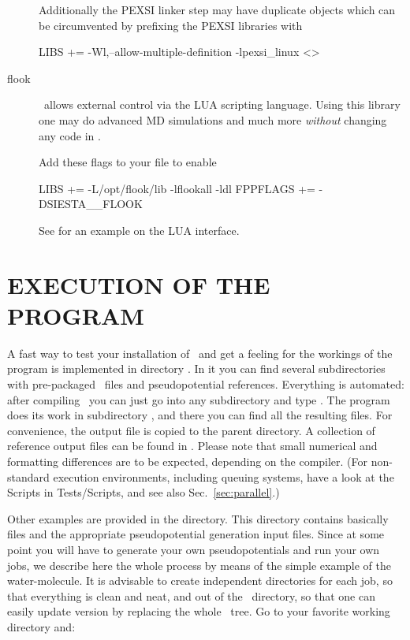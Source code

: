 \begin{description}
  Additionally the PEXSI linker step may have duplicate objects which
  can be circumvented by prefixing the PEXSI libraries with
\begin{shellexample}
  LIBS += -Wl,--allow-multiple-definition -lpexsi_linux <>
\end{shellexample}

  \item[flook]%
  \siesta\ allows external control via the LUA scripting language.
  Using this library one may do advanced MD simulations and much more
  \emph{without} changing any code in \siesta.
  
  Add these flags to your  file to enable 
\begin{shellexample}
  LIBS += -L/opt/flook/lib -lflookall -ldl
  FPPFLAGS += -DSIESTA__FLOOK
\end{shellexample}
  
  See  for an example on the LUA interface.

\end{description}



\section{EXECUTION OF THE PROGRAM}

A fast way to test your installation of \siesta\ and get a feeling for
the workings of the program is implemented in directory
. In it you can find several subdirectories
with pre-packaged \fdflib\ files and pseudopotential references. Everything
is automated: after compiling \siesta\ you can just go into any
subdirectory and type . The program does its work in
subdirectory , and there you can find all the resulting
files. For convenience, the output file is copied to the parent
directory. A collection of reference output files can be found in
. Please note that small numerical and
formatting differences are to be expected, depending on the compiler.
(For non-standard execution environments, including queuing systems,
have a look at the Scripts in Tests/Scripts, and see also
Sec.~\ref{sec:parallel}.)

Other examples are provided in the  directory. This
directory contains basically  files and the appropriate
pseudopotential generation input files. Since at some point you will
have to generate your own pseudopotentials and run your own jobs, we
describe here the whole process by means of the simple example of the
water-molecule. It is advisable to create independent directories for
each job, so that everything is clean and neat, and out of the \siesta\ directory, so that one can easily update version by replacing
the whole \siesta\ tree. Go to your favorite working directory
and:

